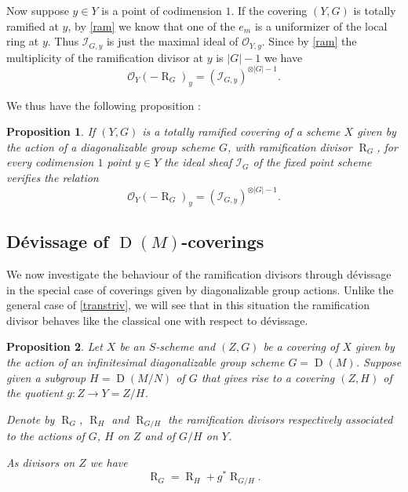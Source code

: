 \documentclass{amsart}
\newtheorem{prop}{Proposition}[section]
\theoremstyle{definition}
\theoremstyle{remark}
\begin{document}
Now suppose $y \in Y$ is a point of codimension $1$. If the covering $(Y,G)$ is totally ramified at $y$, by \ref{ram} we know that one of the $e_m$ is a uniformizer of the local ring at $y$. Thus ${{\mathcal I}}_{G,y}$ is just the maximal ideal of ${{\mathcal O}}_{Y,y}$. Since by \ref{ram} the multiplicity of the ramification divisor at $y$ is $\vert G \vert -1 $ we have \[ {{\mathcal O}}_Y(-\operatorname{R}_G)_y = ({{\mathcal I}}_{G,y})^{\otimes \vert G \vert -1}.\]  

We thus have the following proposition : 

\begin{prop}

If $(Y,G)$ is a totally ramified covering of a scheme $X$ given by the action of a diagonalizable group scheme $G$, with ramification divisor $\operatorname{R}_G$, for every codimension $1$ point $y \in Y$ the ideal sheaf ${{\mathcal I}}_G$ of the fixed point scheme verifies the relation \[ {{\mathcal O}}_Y(-\operatorname{R}_G)_y = ({{\mathcal I}}_{G,y})^{\otimes \vert G \vert -1}.\]   

\end{prop}

\subsection{D\'evissage of $\operatorname{D}(M)$-coverings}

We now investigate the behaviour of the ramification divisors through d\'evissage in the special case of coverings given by diagonalizable group actions. Unlike the general case of \ref{transtriv}, we will see that in this situation the ramification divisor behaves like the classical one with respect to d\'evissage.   

\begin{prop}
Let $X$ be an $S$-scheme and $(Z,G)$ be a covering of $X$ given by the action of an infinitesimal diagonalizable group scheme $G=\operatorname{D}(M)$. Suppose given a subgroup $H = \operatorname{D}(M/N)$ of $G$ that gives rise to a covering $(Z,H)$ of the quotient $g: Z {\longrightarrow} Y=Z/H$.  

Denote by $\operatorname{R}_G$, $\operatorname{R}_H$ and $\operatorname{R}_{G/H}$ the ramification divisors respectively associated to the actions of $G$, $H$ on $Z$ and of $G/H$ on $Y$. 

As divisors on $Z$ we have \[ \operatorname{R}_G = \operatorname{R}_H + g^*\operatorname{R}_{G/H} .\]
\label{devissage}
\end{prop}
\end{document}
